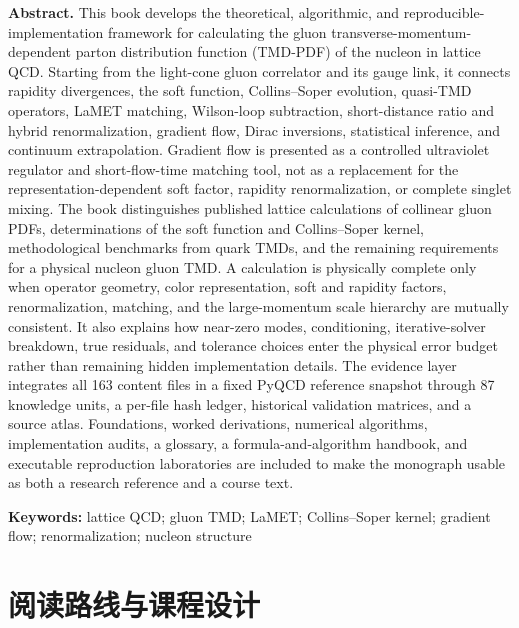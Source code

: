 \documentclass[UTF8,12pt,a4paper,twoside,openany]{ctexbook}
\begin{document}
\begin{tcolorbox}
\vspace{1.2em}
\noindent\textbf{Abstract.}
This book develops the theoretical, algorithmic, and reproducible-implementation framework for calculating the gluon transverse-momentum-dependent parton distribution function (TMD-PDF) of the nucleon in lattice QCD. Starting from the light-cone gluon correlator and its gauge link, it connects rapidity divergences, the soft function, Collins--Soper evolution, quasi-TMD operators, LaMET matching, Wilson-loop subtraction, short-distance ratio and hybrid renormalization, gradient flow, Dirac inversions, statistical inference, and continuum extrapolation. Gradient flow is presented as a controlled ultraviolet regulator and short-flow-time matching tool, not as a replacement for the representation-dependent soft factor, rapidity renormalization, or complete singlet mixing. The book distinguishes published lattice calculations of collinear gluon PDFs, determinations of the soft function and Collins--Soper kernel, methodological benchmarks from quark TMDs, and the remaining requirements for a physical nucleon gluon TMD. A calculation is physically complete only when operator geometry, color representation, soft and rapidity factors, renormalization, matching, and the large-momentum scale hierarchy are mutually consistent. It also explains how near-zero modes, conditioning, iterative-solver breakdown, true residuals, and tolerance choices enter the physical error budget rather than remaining hidden implementation details. The evidence layer integrates all 163 content files in a fixed PyQCD reference snapshot through 87 knowledge units, a per-file hash ledger, historical validation matrices, and a source atlas. Foundations, worked derivations, numerical algorithms, implementation audits, a glossary, a formula-and-algorithm handbook, and executable reproduction laboratories are included to make the monograph usable as both a research reference and a course text.

\vspace{0.7em}
\noindent\textbf{Keywords:} lattice QCD; gluon TMD; LaMET; Collins--Soper kernel; gradient flow; renormalization; nucleon structure
\end{tcolorbox}

\clearpage
\tableofcontents

\clearpage
\listoffigures

\clearpage
\listoftables

\clearpage
\listofalgorithms

\clearpage
\chapter*{阅读路线与课程设计}
\end{document}
